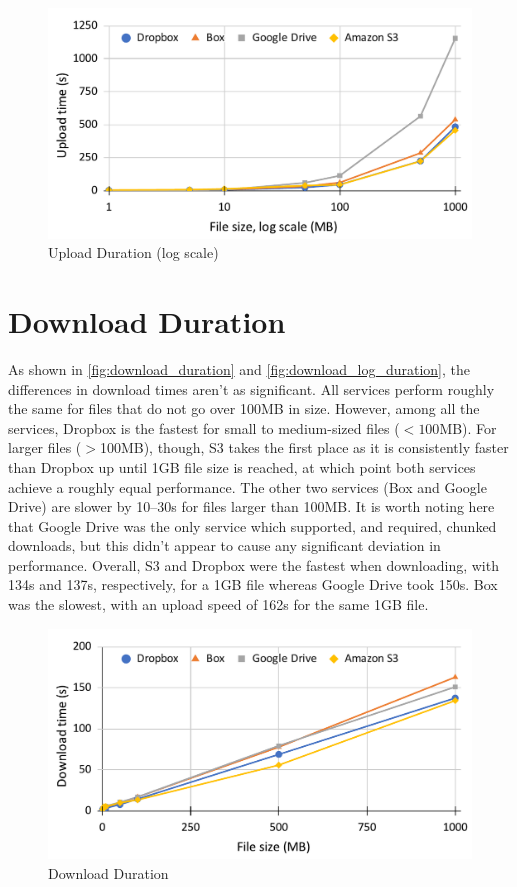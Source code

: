 \begin{figure} [!h]
    \centering
    \includegraphics[scale=0.6]{images/upload_log_chart}
    \caption{\label{fig:upload_log_duration}Upload Duration (log scale)}
\end{figure}

\section{Download Duration}
As shown in \autoref{fig:download_duration} and \autoref{fig:download_log_duration}, the differences in download times aren't as significant. All services perform roughly the same for files that do not go over 100MB in size. However, among all the services, Dropbox is the fastest for small to medium-sized files ($< 100$MB). For larger files ($ >$100MB), though, S3 takes the first place as it is consistently faster than Dropbox up until 1GB file size is reached, at which point both services achieve a roughly equal performance. The other two services (Box and Google Drive) are slower by 10--30s for files larger than 100MB. It is worth noting here that Google Drive was the only service which supported, and required, chunked downloads, but this didn't appear to cause any significant deviation in performance. Overall, S3 and Dropbox were the fastest when downloading, with 134s and 137s, respectively, for a 1GB file whereas Google Drive took 150s. Box was the slowest, with an upload speed of 162s for the same 1GB file.

\begin{figure} [!h]
    \centering
    \includegraphics[scale=0.6]{images/download_chart}
    \caption{\label{fig:download_duration}Download Duration}
\end{figure}

